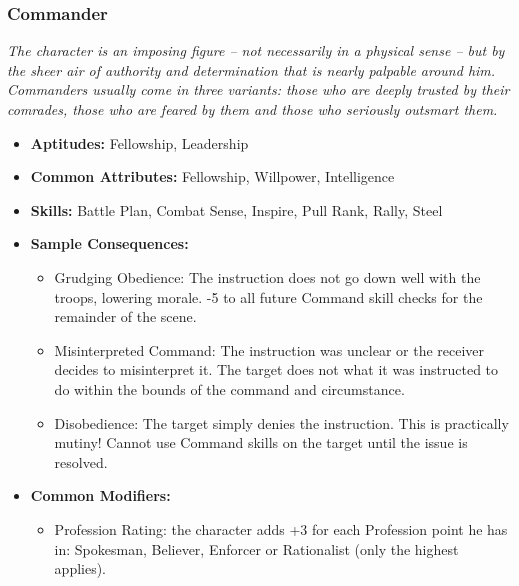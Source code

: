 \subsubsection{Commander}\label{Commander}
\textit{The character is an imposing figure – not necessarily in a physical sense – but by the sheer air of authority and determination that is nearly palpable around him.
Commanders usually come in three variants: those who are deeply trusted by their comrades, those who are feared by them and those who seriously outsmart them.}
\begin{itemize}
	\item \textbf{Aptitudes:} Fellowship, Leadership
	\item \textbf{Common Attributes:} Fellowship, Willpower, Intelligence
	\item \textbf{Skills:} Battle Plan, Combat Sense, Inspire, Pull Rank, Rally, Steel
	\item \textbf{Sample Consequences:} 
	\begin{itemize}
		\item Grudging Obedience: The instruction does not go down well with the troops, lowering morale. -5 to all future Command skill checks for the remainder of the scene.
		\item Misinterpreted Command: The instruction was unclear or the receiver decides to misinterpret it. The target does not what it was instructed to do within the bounds of the command and circumstance.
		\item Disobedience: The target simply denies the instruction. This is practically mutiny! Cannot use Command skills on the target until the issue is resolved.
	\end{itemize}
	\item \textbf{Common Modifiers:}
	\begin{itemize}
		\item Profession Rating: the character adds +3 for each Profession point he has in: Spokesman, Believer, Enforcer or Rationalist (only the highest applies).
	\end{itemize}
\end{itemize}

